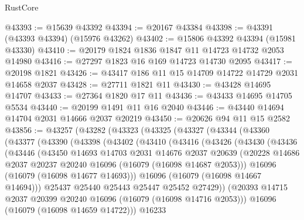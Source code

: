 \begin{lexlean}{RustCore}
\begin{coremodule}
@43393 := @15639 @43392
@43394 := @20167 @43384
@43398 := @43391 (@43393 @43394) (@15976 @43262)
@43402 := @15806 @43392 @43394 (@15981 @43330)
@43410 := @20179 @1824 @1836 @1847 @11 @14723 @14732 @2053 @14980
@43416 := @27297 @1823 @16 @169 @14723 @14730 @2095
@43417 := @20198 @1821
@43426 := @43417 @186 @11 @15 @14709 @14722 @14729 @2031 @14658 @2037
@43428 := @27711 @1821 @11
@43430 := @43428 @14695 @14707
@43433 := @27364 @1820 @17 @11
@43436 := @43433 @14695 @14705 @5534
@43440 := @20199 @1491 @11 @16 @2040
@43446 := @43440 @14694 @14704 @2031 @14666 @2037 @20219
@43450 := @20626 @94 @11 @15 @2582
@43856 := @43257
    (@43282
      (@43323
        (@43325
          (@43327
            (@43344
              (@43360
                (@43377
                  (@43390
                    (@43398
                      (@43402
                        (@43410
                          (@43416
                            (@43426
                              (@43430
                                (@43436
                                  (@43446
                                    (@43450
                                      @14693
                                      @14703
                                      @2031
                                      @14676
                                      @2037
                                      @20639
                                      (@20228
                                        @14686
                                        @2037
                                        @20237
                                        @20240
                                        @16096
                                        (@16079 (@16098 @14687 @2053)))
                                      @16096
                                      (@16079 (@16098 @14677 @14693)))
                                    @16096
                                    (@16079 (@16098 @14667 @14694)))
                                  @25437
                                  @25440
                                  @25443
                                  @25447
                                  @25452
                                  @27429))
                              (@20393
                                @14715
                                @2037
                                @20399
                                @20240
                                @16096
                                (@16079 (@16098 @14716 @2053)))
                              @16096
                              (@16079 (@16098 @14659 @14722)))
                            @16233

\end{coremodule}
\end{lexlean}
